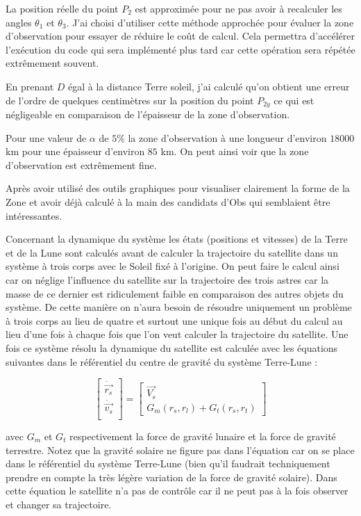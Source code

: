 \documentclass[11pt]{article} %
\begin{document}
		La position réelle du point $P_2$ est approximée pour ne pas avoir à recalculer les angles $\theta_1$ et $\theta_3$. J'ai choisi d'utiliser cette méthode approchée pour évaluer la zone d'observation pour essayer de réduire le coût de calcul. Cela permettra d'accélérer l'exécution du code qui sera implémenté plus tard car cette opération sera répétée extrêmement souvent.
		
		En prenant $D$ égal à la distance Terre soleil, j'ai calculé qu'on obtient une erreur de l'ordre de quelques centimètres sur la position du point $P_{2y}$ ce qui est négligeable en comparaison de l'épaisseur de la zone d'observation.
		
		Pour une valeur de $\alpha$ de $5\%$ la zone d'observation à une longueur d'environ $18000$ km pour une épaisseur d'environ $85$ km. On peut ainsi voir que la zone d'observation est extrêmement fine.
		
		Après avoir utilisé des outils graphiques pour visualiser clairement la forme de la \gls{Zone} et avoir déjà calculé à la main des candidats d'\gls{Obs} qui semblaient être intéressantes.
		
		Concernant la dynamique du système les états (positions et vitesses) de la Terre et de la Lune sont calculés avant de calculer la trajectoire du satellite dans un système à trois corps avec le Soleil fixé à l'origine. On peut faire le calcul ainsi car on néglige l'influence du satellite sur la trajectoire des trois astres car la masse de ce dernier est ridiculement faible en comparaison des autres objets du système. De cette manière on n'aura besoin de résoudre uniquement un problème à trois corps au lieu de quatre et surtout une unique fois au début du calcul au lieu d'une fois à chaque fois que l'on veut calculer la trajectoire du satellite. Une fois ce système résolu la dynamique du satellite est calculée avec les équations suivantes dans le référentiel du centre de gravité du système Terre-Lune :
		
		$$
		\begin{bmatrix}
			\dot{\overrightarrow{r_{s}}}\\
			\dot{\overrightarrow{v_{s}}}\\
		\end{bmatrix} =\begin{bmatrix}
			\overrightarrow{V_{s}}\\
			G_{m}(r_s,r_l)+G_{t}(r_s,r_t)
		\end{bmatrix}
		$$
		
		avec $G_m$ et $G_t$ respectivement la force de gravité lunaire et la force de gravité terrestre. Notez que la gravité solaire ne figure pas dans l'équation car on se place dans le référentiel du système Terre-Lune (bien qu'il faudrait techniquement prendre en compte la très légère variation de la force de gravité solaire). Dans cette équation le satellite n'a pas de contrôle car il ne peut pas à la fois observer et changer sa trajectoire.%
		
\end{document}
